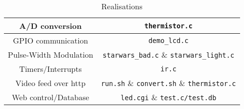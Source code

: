 \begin{table*}
\centering
\begin{tabular}{|c|c|} \hline
A/D conversion   				& \verb!thermistor.c! \\
\hline
GPIO communication   			& \verb!demo_lcd.c! \\
\hline
Pulse-Width Modulation   		& \verb!starwars_bad.c! \& \verb!starwars_light.c! \\
\hline
Timers/Interrupts   			& \verb!ir.c! \\
\hline
Video feed over http  			& \verb!run.sh! \& \verb!convert.sh! \& \verb!thermistor.c! \\
\hline
Web control/Database  			& \verb!led.cgi! \& \verb!test.c/test.db! \\
\hline
\end{tabular}
\caption{Realisations}
\label{tab:programs}
\end{table*}

